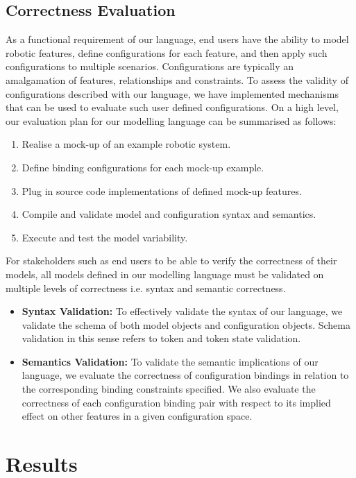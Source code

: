 \documentclass[conference]{IEEEtran}
\begin{document}
\subsection{Correctness Evaluation}
As a functional requirement of our language, end users have the ability to model robotic features, define configurations for each feature, and then apply such configurations to multiple scenarios. Configurations are typically an amalgamation of features, relationships and constraints. To assess the validity of configurations described with our language, we have implemented mechanisms that can be used to evaluate such user defined configurations. On a high level, our evaluation plan for our modelling language can be summarised as follows:
\begin{enumerate}
  \item Realise a mock-up of an example robotic system.
  \item Define binding configurations for each mock-up example.
  \item Plug in source code implementations of defined mock-up features.
  \item Compile and validate model and configuration syntax and semantics.
  \item Execute and test the model variability.
\end{enumerate}
For stakeholders such as end users to be able to verify the correctness of their models, all models defined in our modelling language must be validated on multiple levels of correctness i.e. syntax and semantic correctness. 
\begin{itemize}[label={}]
  \item \textbf{Syntax Validation: }To effectively validate the syntax of our language, we validate the schema of both model objects and configuration objects. Schema validation in this sense refers to token and token state validation.
 
  \item \textbf{Semantics Validation: } To validate the semantic implications of our language, we evaluate the correctness of configuration bindings in relation to the corresponding binding constraints specified. We also evaluate the correctness of each configuration binding pair with respect to its implied effect on other features in a given configuration space.
  
\end{itemize}


\section{Results}
\end{document}
